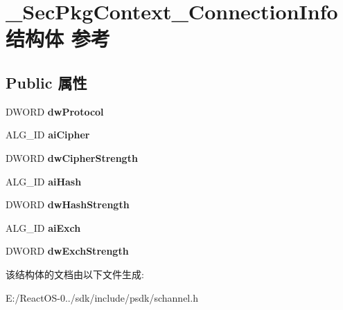 \hypertarget{struct___sec_pkg_context___connection_info}{}\section{\+\_\+\+Sec\+Pkg\+Context\+\_\+\+Connection\+Info结构体 参考}
\label{struct___sec_pkg_context___connection_info}
\subsection*{Public 属性}
\begin{DoxyCompactItemize}
\item 
\mbox{\label{struct___sec_pkg_context___connection_info_acf4dc228c929b5bab1d696bebf2c8b65}} 
D\+W\+O\+RD {\bfseries dw\+Protocol}
\item 
\mbox{\label{struct___sec_pkg_context___connection_info_ace9222fd0859e2983d679c738f4a0c65}} 
A\+L\+G\+\_\+\+ID {\bfseries ai\+Cipher}
\item 
\mbox{\label{struct___sec_pkg_context___connection_info_a680562bb372a63178119566ed62d3fa2}} 
D\+W\+O\+RD {\bfseries dw\+Cipher\+Strength}
\item 
\mbox{\label{struct___sec_pkg_context___connection_info_a8dd0ca15d7b357521f62ee743a2b4cec}} 
A\+L\+G\+\_\+\+ID {\bfseries ai\+Hash}
\item 
\mbox{\label{struct___sec_pkg_context___connection_info_a781850be316b238df93c294a7d289dcb}} 
D\+W\+O\+RD {\bfseries dw\+Hash\+Strength}
\item 
\mbox{\label{struct___sec_pkg_context___connection_info_ac4d3c734ebecbea56fc175d5509df62e}} 
A\+L\+G\+\_\+\+ID {\bfseries ai\+Exch}
\item 
\mbox{\label{struct___sec_pkg_context___connection_info_a6f105ee896f49d942ed02675c948c688}} 
D\+W\+O\+RD {\bfseries dw\+Exch\+Strength}
\end{DoxyCompactItemize}


该结构体的文档由以下文件生成\+:\begin{DoxyCompactItemize}
\item 
E\+:/\+React\+O\+S-\/0../sdk/include/psdk/schannel.\+h\end{DoxyCompactItemize}
